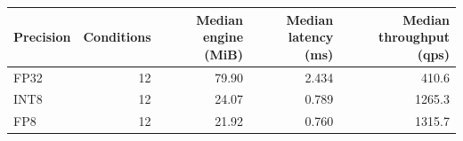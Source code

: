 \begin{tabular}{lrrrr}
\toprule
Precision & Conditions & Median engine (MiB) & Median latency (ms) & Median throughput (qps) \\
\midrule
FP32 & 12 & 79.90 & 2.434 & 410.6 \\
INT8 & 12 & 24.07 & 0.789 & 1265.3 \\
FP8 & 12 & 21.92 & 0.760 & 1315.7 \\
\bottomrule
\end{tabular}
